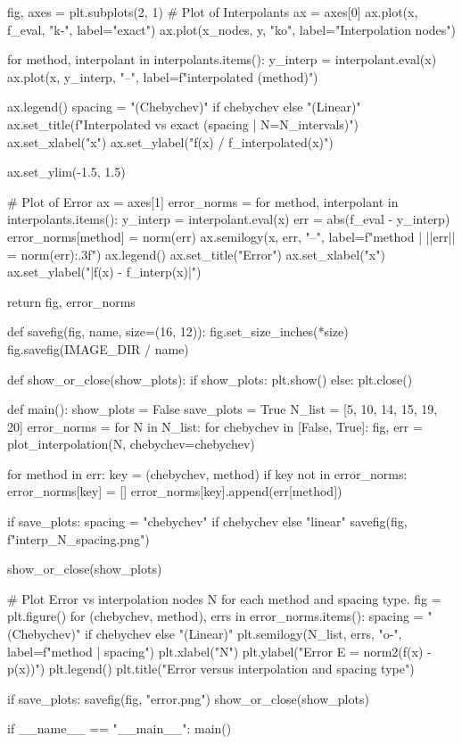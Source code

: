 \documentclass{homework}
\begin{document}
\begin{python}
    fig, axes = plt.subplots(2, 1)
    # Plot of Interpolants
    ax = axes[0]
    ax.plot(x, f_eval, "k-", label="exact")
    ax.plot(x_nodes, y, "ko", label="Interpolation nodes")

    for method, interpolant in interpolants.items():
        y_interp = interpolant.eval(x)
        ax.plot(x, y_interp, "--", label=f"interpolated ({method})")

    ax.legend()
    spacing = "(Chebychev)" if chebychev else "(Linear)"
    ax.set_title(f"Interpolated vs exact ({spacing} | N={N_intervals})")
    ax.set_xlabel("x")
    ax.set_ylabel("f(x) / f_interpolated(x)")

    ax.set_ylim(-1.5, 1.5)

    # Plot of Error
    ax = axes[1]
    error_norms = {}
    for method, interpolant in interpolants.items():
        y_interp = interpolant.eval(x)
        err = abs(f_eval - y_interp)
        error_norms[method] = norm(err)
        ax.semilogy(x, err, "--", label=f"{method} | ||err|| = {norm(err):.3f}")
    ax.legend()
    ax.set_title("Error")
    ax.set_xlabel("x")
    ax.set_ylabel("|f(x) - f_interp(x)|")


    return fig, error_norms


def savefig(fig, name, size=(16, 12)):
    fig.set_size_inches(*size)
    fig.savefig(IMAGE_DIR / name)

def show_or_close(show_plots):
    if show_plots:
        plt.show()
    else:
        plt.close()

def main():
    show_plots = False
    save_plots = True
    N_list = [5, 10, 14, 15, 19, 20]
    error_norms = {}
    for N in N_list:
        for chebychev in [False, True]:
            fig, err = plot_interpolation(N, chebychev=chebychev)

            for method in err:
                key = (chebychev, method)
                if key not in error_norms:
                    error_norms[key] = []
                error_norms[key].append(err[method])

            if save_plots:
                spacing = "chebychev" if chebychev else "linear"
                savefig(fig, f"interp_{N}_{spacing}.png")

            show_or_close(show_plots)

    # Plot Error vs interpolation nodes N for each method and spacing type.
    fig = plt.figure()
    for (chebychev, method), errs in error_norms.items():
        spacing = "(Chebychev)" if chebychev else "(Linear)"
        plt.semilogy(N_list, errs, "o-", label=f"{method} | {spacing}")
    plt.xlabel("N")
    plt.ylabel("Error E = norm2(f(x) - p(x))")
    plt.legend()
    plt.title("Error versus interpolation and spacing type")

    if save_plots:
        savefig(fig, "error.png")
    show_or_close(show_plots)





if __name__ == "__main__":
    main()

\end{python}
\end{document}
